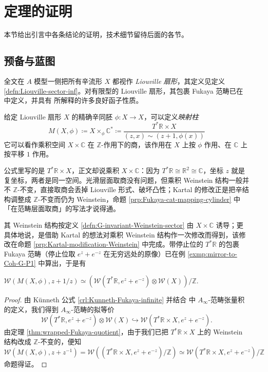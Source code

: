 \section{定理的证明\label{sec:proof-of-theorems}}

本节给出引言中各条结论的证明，技术细节留待后面的各节。

\subsection{预备与蓝图}

全文在 $A$ 模型一侧把所有辛流形 $X$ 都视作 \emph{Liouville 扇形}，其定义见定义 \ref{defn:Liouville-sector-inf}。对有限型的 Liouville 扇形，其包裹 Fukaya 范畴已在 \cite{GPS20} 中定义，并具有 \cite{GPS24S} 所解释的许多良好函子性质。

给定 Liouville 扇形 $X$ 的精确辛同胚 $\phi\colon X\to X$，可以定义\emph{映射柱}
\[
    M (X,\phi )\coloneqq X\times_{\phi}\mathbb{C}^{\ast}\coloneqq\frac{T^{\ast}\mathbb{R}\times X}{(z,x)\sim (z+1,\phi (x))}
\]
它可以看作乘积空间 $X\times\mathbb{C}$ 在 $\mathbb{Z}$-作用下的商，该作用在 $X$ 上按 $\phi$ 作用、在 $\mathbb{C}$ 上按平移 $1$ 作用。

\begin{yizhu}
公式里写的是 $T^{\ast}\mathbb{R}\times X$，正文却说乘积 $X\times\mathbb{C}$：因为 $T^{\ast}\mathbb{R}\cong\mathbb{R}^2\cong\mathbb{C}$，坐标 $z$ 就是复坐标，两者是同一空间。光滑层面取商没有问题，但乘积 Weinstein 结构一般并不 $\mathbb{Z}$-不变，直接取商会丢掉 Liouville 形式、破坏凸性；Kartal 的修改正是把辛结构调整成 $\mathbb{Z}$-不变而仍为 Weinstein，命题 \ref{prp:Fukaya-cat-mapping-cylinder} 中「在范畴层面取商」的写法才说得通。
\end{yizhu}

其 Weinstein 结构按定义 \ref{defn:G-invariant-Weinstein-sector} 由 $X\times\mathbb{C}$ 诱导；更具体地说，是借助 Kartal \cite{Kartal21} 的想法对乘积 Weinstein 结构作一次修改而得到，该修改在命题 \ref{prp:Kartal-modification-Weinstein} 中完成。带停止位的 $T^{\ast}\mathbb{R}$ 的包裹 Fukaya 范畴（停止位取 $e^z+e^{-z}$ 在无穷远处的原像）已在例 \ref{exmp:mirror-to-Coh-G-P1} 中算出，于是有

\begin{prp}\label{prp:Fukaya-cat-mapping-cylinder}
    $\mathcal{W} (M(X,\phi),z+1/z)\simeq\left(\mathcal{W} (T^{\ast}\mathbb{R}, e^z+e^{-z})\otimes\mathcal{W} (X)\right)/\mathbb{Z}$.
\end{prp}
\begin{proof}
    由 Künneth 公式 \ref{crl:Kunneth-Fukaya-infinite} 并结合 \cite{Ornaghi25} 中 $A_{\infty}$-范畴张量积的定义，我们得到 $A_{\infty}$-范畴的拟等价 \[
        \mathcal{W} (T^{\ast}\mathbb{R},e^z+e^{-z})\otimes\mathcal{W} (X)\hookrightarrow\mathcal{W} (T^{\ast}\mathbb{R}\times X, e^z+e^{-z}).
    \]由定理 \ref{thm:wrapped-Fukaya-quotient}，由于我们已把 $T^{\ast}\mathbb{R}\times X$ 上的 Weinstein 结构改成 $\mathbb{Z}$-不变的，便知 \[
        \mathcal{W} (M(X,\phi),z+z^{-1})=\mathcal{W}\left((T^{\ast}\mathbb{R}\times X,e^z+e^{-z})/\mathbb{Z}\right)\simeq\mathcal{W} (T^{\ast}\mathbb{R}\times X,e^z+e^{-z})/\mathbb{Z}
    \]命题得证。
\end{proof}

